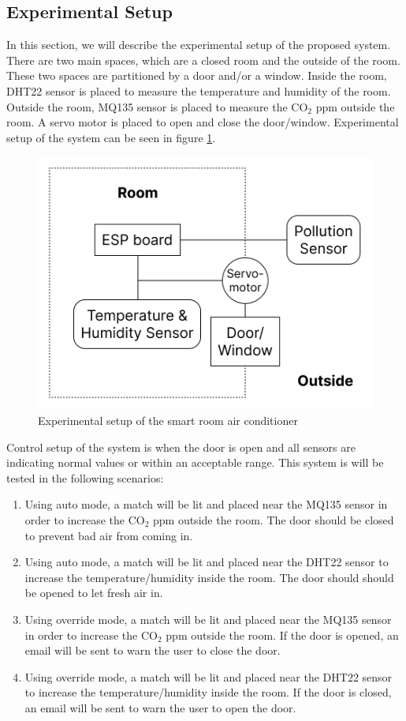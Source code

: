 \subsection{Experimental Setup}
In this section, we will describe the experimental setup of the proposed system.
There are two main spaces, which are a closed room and the outside of the room.
These two spaces are partitioned by a door and/or a window. Inside the room,
DHT22 sensor is placed to measure the temperature and humidity of the room.
Outside the room, MQ135 sensor is placed to measure the CO$_2$ ppm outside the room.
A servo motor is placed to open and close the door/window.
Experimental setup of the system can be seen in figure \ref{setup}.

\begin{figure}
      \centerline{\includegraphics[scale=0.4]{resources/setup.png}}
      \caption{Experimental setup of the smart room air conditioner}
      \label{setup}
\end{figure}

Control setup of the system is when the door is open and all sensors are
indicating normal values or within an acceptable range. This system is will be
tested in the following scenarios:
\begin{enumerate}
      \item Using auto mode, a match will be lit and placed near the MQ135 sensor
            in order to increase the CO$_2$ ppm outside the room. The door should
            be closed to prevent bad air from coming in.
      \item Using auto mode, a match will be lit and placed near the DHT22 sensor
            to increase the temperature/humidity inside the room. The door should
            should be opened to let fresh air in.
      \item Using override mode, a match will be lit and placed near the MQ135
            sensor in order to increase the CO$_2$ ppm outside the room. If the door
            is opened, an email will be sent to warn the user to close the door.
      \item Using override mode, a match will be lit and placed near the DHT22
            sensor to increase the temperature/humidity inside the room. If the door
            is closed, an email will be sent to warn the user to open the door.
\end{enumerate}

